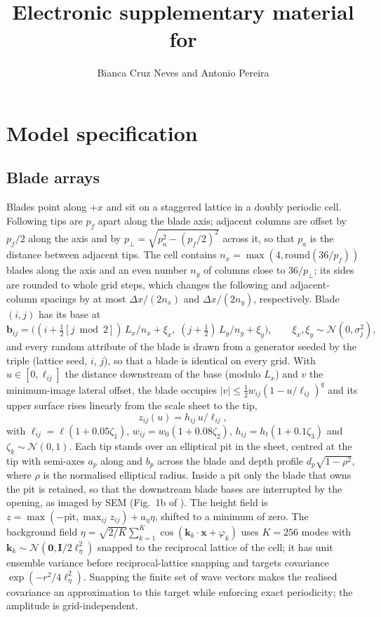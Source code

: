 \documentclass[11pt]{article}
\title{Electronic supplementary material for\\[4pt]\large \TITLE}
\author{Bianca Cruz Neves and Antonio Pereira}
\date{}
\begin{document}
\maketitle

\section{Model specification}

\subsection{Blade arrays}
Blades point along $+x$ and sit on a staggered lattice in a doubly periodic cell. Following tips are $p_f$ apart along the blade axis; adjacent columns are offset by $p_f/2$ along the axis and by $p_\perp=\sqrt{p_a^2-(p_f/2)^2}$ across it, so that $p_a$ is the distance between adjacent tips. The cell contains $n_x=\max(4,\mathrm{round}(36/p_f))$ blades along the axis and an even number $n_y$ of columns close to $36/p_\perp$; its sides are rounded to whole grid steps, which changes the following and adjacent-column spacings by at most $\Delta x/(2n_x)$ and $\Delta x/(2n_y)$, respectively. Blade $(i,j)$ has its base at
\begin{equation}
\mathbf b_{ij}=\big((i+\tfrac12[j\bmod2])\,L_x/n_x+\xi_x,\;(j+\tfrac12)\,L_y/n_y+\xi_y\big),\qquad \xi_x,\xi_y\sim\mathcal N(0,\sigma_j^2),
\end{equation}
and every random attribute of the blade is drawn from a generator seeded by the triple (lattice seed, $i$, $j$), so that a blade is identical on every grid. With $u\in[0,\ell_{ij}]$ the distance downstream of the base (modulo $L_x$) and $v$ the minimum-image lateral offset, the blade occupies $|v|\le\tfrac12w_{ij}(1-u/\ell_{ij})^{q}$ and its upper surface rises linearly from the scale sheet to the tip,
\begin{equation}
z_{ij}(u)=h_{ij}\,u/\ell_{ij},
\end{equation}
with $\ell_{ij}=\ell(1+0.05\zeta_1)$, $w_{ij}=w_0(1+0.08\zeta_2)$, $h_{ij}=h_t(1+0.1\zeta_3)$ and $\zeta_k\sim\mathcal N(0,1)$. Each tip stands over an elliptical pit in the sheet, centred at the tip with semi-axes $a_p$ along and $b_p$ across the blade and depth profile $d_p\sqrt{1-\rho^2}$, where $\rho$ is the normalised elliptical radius. Inside a pit only the blade that owns the pit is retained, so that the downstream blade bases are interrupted by the opening, as imaged by SEM (Fig.~1b of \cite{Peroutka2026}). The height field is $z=\max(-\text{pit},\max_{ij}z_{ij})+a_\eta\eta$, shifted to a minimum of zero. The background field $\eta=\sqrt{2/K}\sum_{k=1}^{K}\cos(\mathbf k_k\cdot\mathbf x+\varphi_k)$ uses $K=256$ modes with $\mathbf k_k\sim\mathcal N(\mathbf0,\mathbf I/2\ell_\eta^2)$ snapped to the reciprocal lattice of the cell; it has unit ensemble variance before reciprocal-lattice snapping and targets covariance $\exp(-r^2/4\ell_\eta^2)$. Snapping the finite set of wave vectors makes the realised covariance an approximation to this target while enforcing exact periodicity; the amplitude is grid-independent.
\end{document}
